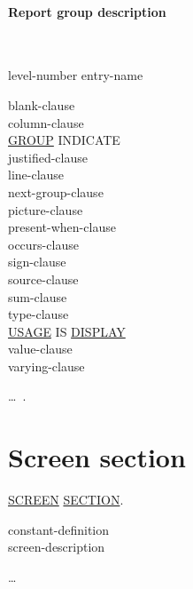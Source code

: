 \documentclass[a4paper,oneside,svgnames]{scrbook}
\makeatletter
\newcommand{\key}[1]{\underline{#1}}
\newcommand{\pending}[1]{%
  \textcolor{gray!75}{#1}}
\newenvironment{0-1}{$\left[ \begin{tabular}{@{}l@{}}}{\end{tabular} \right]$}
\makeatother
\begin{document}
\paragraph{Report group description}
\ {}\newline
\pending{
  level-number entry-name
  \begin{0-1}
    blank-clause \\
    column-clause \\
    \key{GROUP} INDICATE \\
    justified-clause \\
    line-clause \\
    next-group-clause \\
    picture-clause \\
    present-when-clause \\
    occurs-clause \\
    sign-clause \\
    source-clause \\
    sum-clause \\
    type-clause \\
    \key{USAGE} IS \key{DISPLAY} \\
    value-clause \\
    varying-clause
  \end{0-1}\ldots\ {}.
}

\section{Screen section}
\key{SCREEN} \key{SECTION}.\newline
\begin{0-1}
  constant-definition \\
  screen-description
\end{0-1}\ldots
\end{document}
